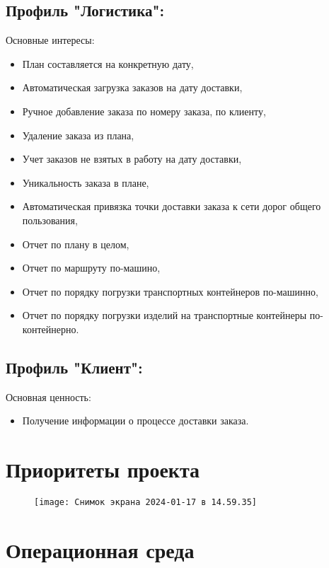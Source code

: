 \subsection{Профиль "Логистика":}
\label{subsec:log}

Основные интересы:
\begin{itemize}
    \item План составляется на конкретную дату,
    \item Автоматическая загрузка заказов на дату доставки,
    \item Ручное добавление заказа по номеру заказа, по клиенту,
    \item Удаление заказа из плана,
    \item Учет заказов не взятых в работу на дату доставки,
    \item Уникальность заказа в плане,
    \item Автоматическая привязка точки доставки заказа к сети дорог общего пользования,
    \item Отчет по плану в целом,
    \item Отчет по маршруту по-машино,
    \item Отчет по порядку погрузки транспортных контейнеров по-машинно,
    \item Отчет по порядку погрузки изделий на транспортные контейнеры по-контейнерно.
\end{itemize}

\subsection{Профиль "Клиент":}
\label{subsec:customer}

Основная ценность:
\begin{itemize}
    \item Получение информации о процессе доставки заказа.
\end{itemize}


\section{Приоритеты проекта}
\label{sec:priorities}

\begin{figure}
    \centering
    \texttt{[image: Снимок экрана 2024-01-17 в 14.59.35]}
    \label{fig:}
\end{figure}


\section{Операционная среда}
\label{sec:env}

